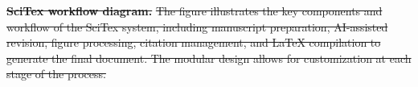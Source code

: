 \documentclass[preprint,review,12pt]{elsarticle}%
\providecommand{\DIFdeltex}[1]{{\protect\color{red}\sout{#1}}}                      %
\providecommand{\DIFdelFL}[1]{\DIFdel{#1}} %
\providecommand{\DIFdel}[1]{\texorpdfstring{\DIFdeltex{#1}}{}} %
\begin{document}
\begin{frontmatter}



{%
\textbf{\DIFdelFL{SciTex workflow diagram.}} %
\DIFdelFL{The figure illustrates the key components and workflow of the SciTex system, including manuscript preparation, AI-assisted revision, figure processing, citation management, and LaTeX compilation to generate the final document. The modular design allows for customization at each stage of the process.}}




\end{frontmatter}
\end{document}
